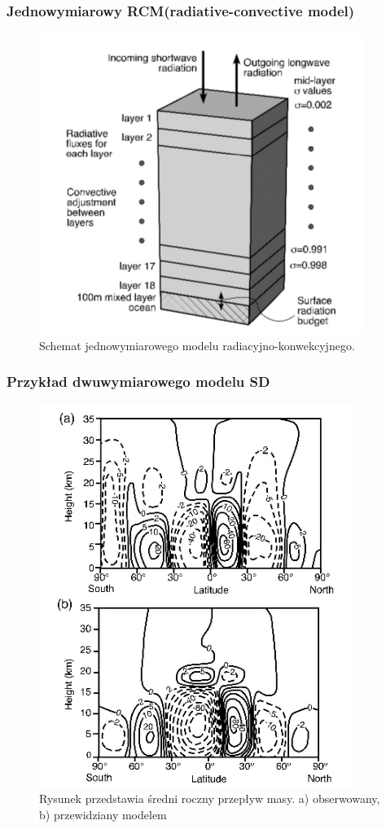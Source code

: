 \documentclass{beamer}
\begin{document}
\begin{frame}
	\frametitle{Jednowymiarowy RCM(radiative-convective model)}	
	\begin{figure}[h]
		\begin{center}
			\includegraphics[width=0.6\linewidth]{images/1D_RC.png}
			\caption{Schemat jednowymiarowego modelu radiacyjno-konwekcyjnego.\cite{b1}}
		\end{center}
	\end{figure}
\end{frame}






\begin{frame}
	\frametitle{Przykład dwuwymiarowego modelu SD}
	
	\begin{figure}[h]
		\begin{center}
			\includegraphics[width=0.4\linewidth]{images/2D_model.png}
			\caption{Rysunek przedstawia średni roczny przepływ masy. a) obserwowany, b) przewidziany modelem\cite{b1}}
		\end{center}
	\end{figure}
	
\end{frame}
\end{document}
